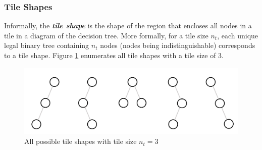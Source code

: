 \subsubsection{Tile Shapes}
Informally, the \textbf{\emph{tile shape}} is the shape of the region that encloses all nodes in a tile in a diagram of the decision tree.
More formally, for a tile size $n_t$, each unique legal binary tree containing $n_t$ nodes (nodes being indistinguishable) corresponds to
a tile shape. Figure \ref{Fig:TileSize3Shapes} enumerates all tile shapes with a tile size of 3. 




\begin{figure}
  \centering
  \includegraphics[width=\linewidth]{figures/TileShapes_Size3.PNG}
  \caption{All possible tile shapes with tile size $n_t=3$}
  \label{Fig:TileSize3Shapes}
\end{figure}

